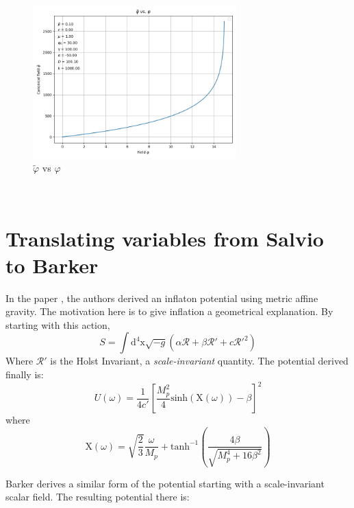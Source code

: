 \documentclass[aps,prd,reprint,preprintnumbers,showpacs,floatfix,nofootinbib,superscript address]{revtex4-2}
\begin{document}
\begin{figure}[h!]
    \centering
    \includegraphics[width=0.7\textwidth]{Python/Figures/Field vs Canonical Field.png}
    \caption{$\tilde{\varphi}$ vs $\varphi$}
    \label{Canonical field vs field}
\end{figure}

\newpage
$\,$
\newpage

\appendix

\section{Translating variables from Salvio to Barker} \label{Appendix A}

In the paper \cite{Salvio_2022}, the authors derived an inflaton potential using metric affine gravity. The motivation here is to give inflation a geometrical explanation. 
By starting with this action, 
\begin{equation}
    S = \int \text{d}^4\text{x} \sqrt{-g} (\alpha \mathcal{R} + \beta \mathcal{R}' + c \mathcal{R}'^{2})
\end{equation}
Where $\mathcal{R}'$ is the Holst Invariant, a \textit{scale-invariant} quantity. The potential derived finally is: 
\begin{equation}
    U(\omega) = \frac{1}{4 c'} \left[ \frac{M_{p}^{2}}{4} \text{sinh}(\text{X}(\omega)) - \beta  \right]^2
\end{equation}
where
\begin{equation}
    \text{X}(\omega) = \sqrt{\frac{2}{3}} \frac{\omega}{M_{p}} + \text{tanh}^{-1} \left(\frac{4 \beta}{\sqrt{M_{p}^{4}+16 \beta^2}} \right)
\end{equation}

Barker \cite{barker2024poincaregaugetheoryconformal} derives a similar form of the potential starting with a scale-invariant scalar field. The resulting potential there is:
\end{document}
